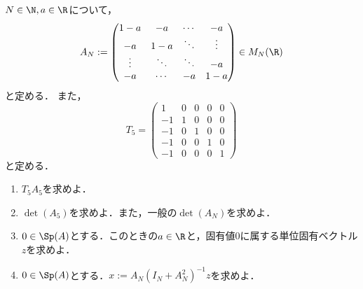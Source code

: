 \documentclass[uplatex,dvipdfmx]{jsarticle}
\begin{document}
\begin{tcolorbox}[colframe=ForestGreen, colback=ForestGreen!10!white,breakable,colbacktitle=ForestGreen!40!white,coltitle=black,fonttitle=\bfseries\sffamily,
    title=第２問]
    $N\in\N,a\in\R$について，
    \[A_N:=\begin{pmatrix}
        1-a&-a&\cdots&-a\\
        -a&1-a&\ddots&\vdots\\
        \vdots&\ddots&\ddots&-a\\
        -a&\cdots&-a&1-a
    \end{pmatrix}\in M_N(\R)\]
    と定める．
    また，
    \[T_5=\begin{pmatrix}
        1&0&0&0&0\\
        -1&1&0&0&0\\
        -1&0&1&0&0\\
        -1&0&0&1&0\\
        -1&0&0&0&1
    \end{pmatrix}\]
    と定める．
    \begin{enumerate}
        \item $T_5A_5$を求めよ．
        \item $\det(A_5)$を求めよ．また，一般の$\det(A_N)$を求めよ．
        \item $0\in\Sp(A)$とする．このときの$a\in\R$と，固有値$0$に属する単位固有ベクトル$z$を求めよ．
        \item $0\in\Sp(A)$とする．$x:=A_N(I_N+A_N^2)^{-1}z$を求めよ．
    \end{enumerate}
\end{tcolorbox}
\end{document}
